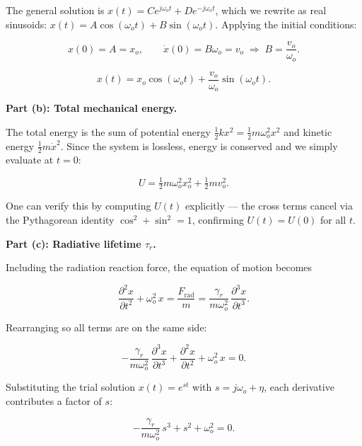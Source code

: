 The general solution is $x(t) = C e^{j\omega_o t} + D e^{-j\omega_o t}$, which we rewrite as real sinusoids: $x(t) = A\cos(\omega_o t) + B\sin(\omega_o t)$. Applying the initial conditions:

\begin{equation*}
  x(0) = A = x_o, \qquad
  \dot{x}(0) = B\omega_o = v_o \;\Longrightarrow\; B = \frac{v_o}{\omega_o}.
\end{equation*}

\begin{equation*}
  \boxed{x(t) = x_o\cos(\omega_o t) + \frac{v_o}{\omega_o}\sin(\omega_o t).}
\end{equation*}

\textbf{Part (b): Total mechanical energy.}

The total energy is the sum of potential energy $\tfrac{1}{2}kx^2 = \tfrac{1}{2}m\omega_o^2 x^2$ and kinetic energy $\tfrac{1}{2}m\dot{x}^2$. Since the system is lossless, energy is conserved and we simply evaluate at $t=0$:

\begin{equation*}
  \boxed{U = \tfrac{1}{2}m\omega_o^2 x_o^2 + \tfrac{1}{2}m v_o^2.}
\end{equation*}

One can verify this by computing $U(t)$ explicitly — the cross terms cancel via the Pythagorean identity $\cos^2 + \sin^2 = 1$, confirming $U(t) = U(0)$ for all $t$.

\textbf{Part (c): Radiative lifetime $\tau_r$.}

Including the radiation reaction force, the equation of motion becomes

\begin{equation*}
  \frac{\partial^2 x}{\partial t^2} + \omega_o^2\,x = \frac{F_{\mathrm{rad}}}{m}
  = \frac{\gamma_r}{m\omega_o^2}\,\frac{\partial^3 x}{\partial t^3}.
\end{equation*}

Rearranging so all terms are on the same side:

\begin{equation*}
  -\frac{\gamma_r}{m\omega_o^2}\,\frac{\partial^3 x}{\partial t^3}
  + \frac{\partial^2 x}{\partial t^2} + \omega_o^2\,x = 0.
\end{equation*}

Substituting the trial solution $x(t) = e^{st}$ with $s = j\omega_o + \eta$, each derivative contributes a factor of $s$:

\begin{equation*}
  -\frac{\gamma_r}{m\omega_o^2}\,s^3 + s^2 + \omega_o^2 = 0.
\end{equation*}

